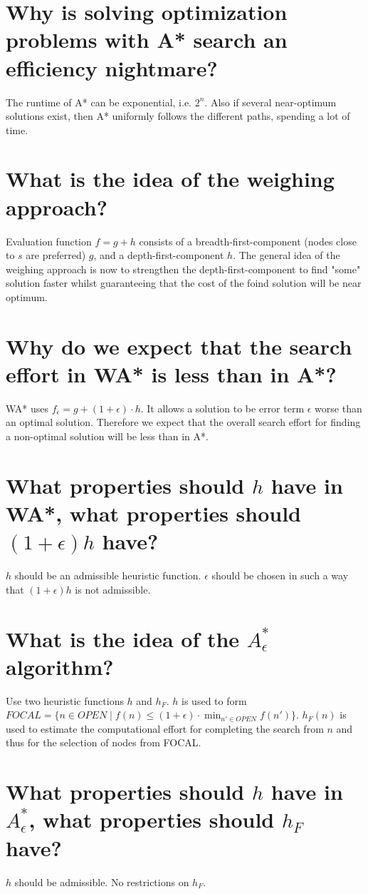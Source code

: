 \documentclass[12pt, a4paper]{article}
\begin{document}
\section{Why is solving optimization problems with A* search an efficiency nightmare?}
The runtime of A* can be exponential, i.e. $2^n$. Also if several near-optimum solutions exist, then A* uniformly follows the different paths, spending a lot of time.

\section{What is the idea of the weighing approach?}
Evaluation function $f = g + h$ consists of a breadth-first-component (nodes close to $s$ are preferred) $g$, and a depth-first-component $h$. The general idea of the weighing approach is now to strengthen the depth-first-component to find "some" solution faster whilst guaranteeing that the cost of the foind solution will be near optimum. 

\section{Why do we expect that the search effort in WA* is less than in A*?}
WA* uses $f_{\epsilon} = g + (1 + \epsilon) \cdot h$.  It allows a solution to be error term $\epsilon$ worse than an optimal solution. Therefore we expect that the overall search effort for finding a non-optimal solution will be less than in A*.

\section{What properties should $h$ have in WA*, what properties should $(1 + \epsilon)h$ have?}
$h$ should be an admissible heuristic function. $\epsilon$ should be chosen in such a way that $(1 + \epsilon)h$ is not admissible. 

\section{What is the idea of the $A^*_{\epsilon}$ algorithm?}
Use two heuristic functions $h$ and $h_F$. $h$ is used to form $FOCAL = \{n \in OPEN \mid f(n) \leq (1 + \epsilon) \cdot \min_{n' \in OPEN}   f(n')\}$. $h_F(n)$ is used to estimate the computational effort for completing the search from $n$ and thus for the selection of nodes from FOCAL.

\section{What properties should $h$ have in $A^*_\epsilon$, what properties should $h_F$ have?}
$h$ should be admissible. No restrictions on $h_F$.
\end{document}
